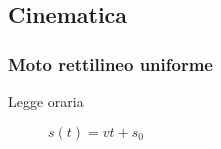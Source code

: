 \documentclass[a4paper,11pt,italian]{article}
\begin{document}
\subsection{Cinematica}\label{sec:cinematica}
\subsubsection{Moto rettilineo uniforme}
\begin{description}
  \item[Legge oraria] 
  $ s(t) = v  t + s_0 $
\end{description}
\end{document}
